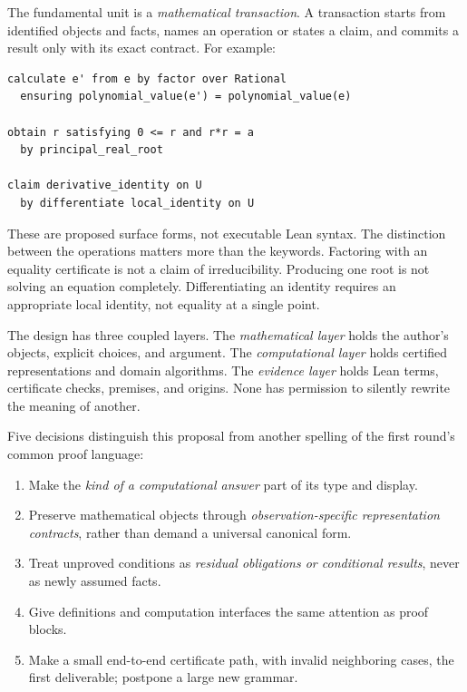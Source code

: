 \documentclass[11pt,a4paper]{article}
\theoremstyle{definition}
\begin{document}
The fundamental unit is a \emph{mathematical transaction}. A transaction starts
from identified objects and facts, names an operation or states a claim, and
commits a result only with its exact contract. For example:
\par\noindent\begin{minipage}{\linewidth}
\begin{lstlisting}
calculate e' from e by factor over Rational
  ensuring polynomial_value(e') = polynomial_value(e)

obtain r satisfying 0 <= r and r*r = a
  by principal_real_root

claim derivative_identity on U
  by differentiate local_identity on U
\end{lstlisting}
\end{minipage}\par
These are proposed surface forms, not executable Lean syntax. The distinction
between the operations matters more than the keywords. Factoring with an equality
certificate is not a claim of irreducibility. Producing one root is not solving
an equation completely. Differentiating an identity requires an appropriate
local identity, not equality at a single point.

The design has three coupled layers. The \emph{mathematical layer} holds the
author's objects, explicit choices, and argument. The \emph{computational layer}
holds certified representations and domain algorithms. The \emph{evidence layer}
holds Lean terms, certificate checks, premises, and origins. None has permission
to silently rewrite the meaning of another.

Five decisions distinguish this proposal from another spelling of the first
round's common proof language:
\begin{enumerate}[itemsep=.25em]
\item Make the \emph{kind of a computational answer} part of its type and display.
\item Preserve mathematical objects through \emph{observation-specific representation
contracts}, rather than demand a universal canonical form.
\item Treat unproved conditions as \emph{residual obligations or conditional results},
never as newly assumed facts.
\item Give definitions and computation interfaces the same attention as proof blocks.
\item Make a small end-to-end certificate path, with invalid neighboring cases,
the first deliverable; postpone a large new grammar.
\end{enumerate}
\end{document}
